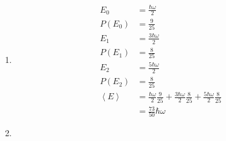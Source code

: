 \documentclass{article}
\newcommand{\ev}[1]{\left< #1 \right>}
\begin{document}
\begin{enumerate}
  \item

        \begin{align*}
          E_0    & = \frac{\hbar \omega}{2}                                                                                              \\
          P(E_0) & = \frac{9}{25}                                                                                                        \\
          E_1    & = \frac{3 \hbar \omega}{2}                                                                                            \\
          P(E_1) & = \frac{8}{25}                                                                                                        \\
          E_2    & = \frac{5 \hbar \omega}{2}                                                                                            \\
          P(E_2) & = \frac{8}{25}                                                                                                        \\
          \ev{E} & = \frac{\hbar \omega}{2} \frac{9}{25} + \frac{3 \hbar \omega}{2} \frac{8}{25} + \frac{5 \hbar \omega}{2} \frac{8}{25} \\
                 & = \frac{73}{50} \hbar \omega
        \end{align*}

  \item


\end{enumerate}
\end{document}
